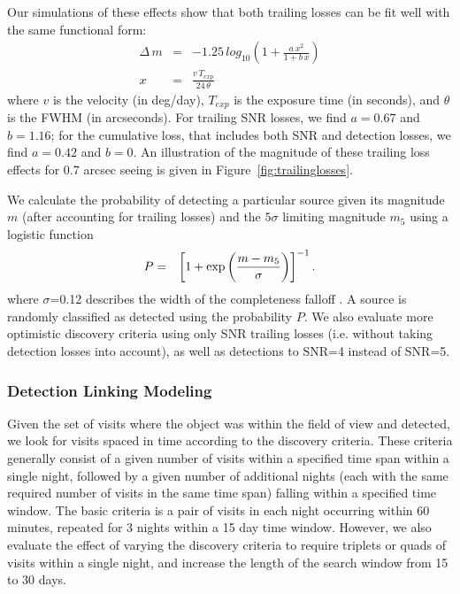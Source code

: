 Our simulations of these effects show that both trailing losses can be fit well with the
same functional form:
\begin{eqnarray}
\Delta \, m & = &-1.25 \, log_{10} \left( 1 + \frac{a \, x^2} { 1 + b\,
    x} \right) \\
x & = & \frac{v \, T_{exp}} {24 \, \theta}
\end{eqnarray}
where $v$ is the velocity (in deg/day), $T_{exp}$ is the exposure time (in seconds), and $\theta$ is the FWHM (in arcseconds). For trailing SNR losses, we find $a = 0.67$ and $b = 1.16$; for the cumulative loss, that includes both SNR and detection losses,
we find $a=0.42$ and $b=0$. An illustration of the magnitude of these trailing loss effects for 0.7 arcsec seeing is given in Figure~\ref{fig:trailinglosses}.

We calculate the probability of detecting a particular source given its magnitude $m$ (after accounting for trailing losses)
and the $5\sigma$ limiting magnitude $m_5$ using a logistic function
\begin{eqnarray}
     P & = & \left[ 1 +  {\rm exp}\left(\frac {m -  m_5}{\sigma}\right) \right]^{-1}.
\end{eqnarray}
where $\sigma$=0.12 describes the width of the completeness falloff \citep{2014ApJ...794..120A}. A source is randomly classified
as detected using the probability $P$. We also evaluate more optimistic discovery criteria using only SNR trailing losses
(i.e. without taking detection losses into account), as well as detections to SNR=4 instead of SNR=5.


\subsubsection{Detection Linking Modeling}

Given the set of visits where the object was within the field of view and detected, we look for visits spaced in time
according to the discovery criteria. These criteria generally consist of a given number of visits within a specified
time span within a single night, followed by a given number of additional nights (each with the same required number
of visits in the same time span) falling within a specified time window. The basic criteria is a pair of visits in each
night occurring within 60 minutes, repeated for 3 nights within a 15 day time window. However, we also evaluate
the effect of varying the discovery criteria to require triplets or quads of visits within a single night, and increase
the length of the search window from 15 to 30 days.


